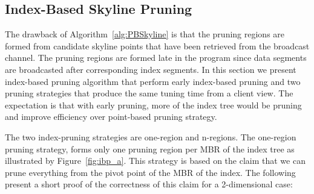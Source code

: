 \subsection{Index-Based Skyline Pruning}

The drawback of Algorithm~\ref{alg:PBSkyline} is that the
pruning regions are formed from candidate skyline points that have
been retrieved from the broadcast channel. The pruning regions are
formed late in the program since data segments are broadcasted
after corresponding index segments.
In this section we present index-based pruning algorithm that perform
early index-based pruning and two pruning strategies that produce
the same tuning time from a client view.
The expectation is that with early pruning,
more of the index tree would be pruning and improve efficiency over
point-based pruning strategy.

The two index-pruning strategies are one-region and n-regions. 
The one-region pruning strategy, forms only one pruning region per
MBR of the index tree as illustrated by Figure~\ref{fig:ibp_a}.
This strategy is based on the claim that we can prune everything from
the pivot point of the MBR of the index. The following present a short
proof of the correctness of this claim for a 2-dimensional case:

